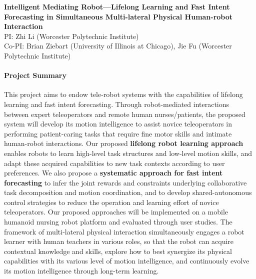 \pagebreak

\begin{center}
	{\Large \bf Intelligent Mediating Robot---Lifelong Learning and Fast Intent Forecasting in Simultaneous Multi-lateral Physical Human-robot Interaction}\\
    \vspace{4pt}
   	{\large PI: Zhi Li (Worcester Polytechnic Institute)\\
    Co-PI: Brian Ziebart (University of Illinois at Chicago), Jie Fu (Worcester Polytechnic Institute)}
\end{center}

\vspace{1 em}

\paragraph*{\Large Project Summary} 
This project aims to endow tele-robot systems with the capabilities of lifelong learning and fast intent forecasting.
Through robot-mediated interactions between expert teleoperators and remote human nurses/patients, the proposed system will develop its motion intelligence to assist novice teleoperators in performing patient-caring tasks that require fine motor skills and intimate human-robot interactions.
Our proposed \textbf{lifelong robot learning approach} enables robots to learn high-level task structures and low-level motion skills, and adapt these acquired capabilities to new task contexts according to user preferences.
We also propose a \textbf{systematic approach for fast intent forecasting} to infer the joint rewards and constraints underlying collaborative task decomposition and motion coordination, and to develop shared-autonomous control strategies to reduce the operation and learning effort of novice teleoperators.
Our proposed approaches will be implemented on a mobile humanoid nursing robot platform and evaluated through user studies.
The framework of multi-lateral physical interaction simultaneously engages a robot learner with human teachers in various roles, so that the robot can acquire contextual knowledge and skills, explore how to best synergize its physical capabilities with its various level of motion intelligence, and continuously evolve its motion intelligence through long-term learning.





